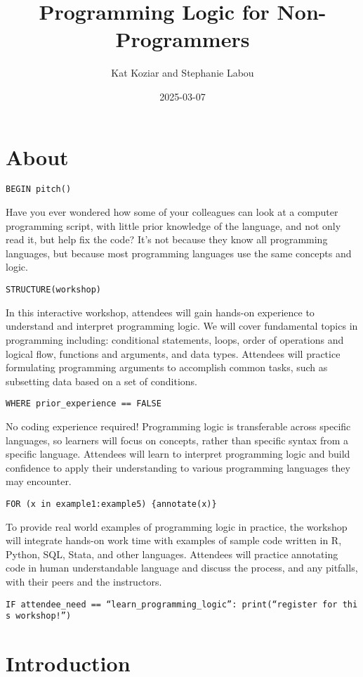 \documentclass[
]{book}
\title{Programming Logic for Non-Programmers}
\author{Kat Koziar and Stephanie Labou}
\date{2025-03-07}
\begin{document}
\maketitle

{
\setcounter{tocdepth}{1}
\tableofcontents
}
\chapter{About}\label{about}

\texttt{BEGIN\ pitch()}

Have you ever wondered how some of your colleagues can look at a computer programming script, with little prior knowledge of the language, and not only read it, but help fix the code? It's not because they know all programming languages, but because most programming languages use the same concepts and logic.

\texttt{STRUCTURE(workshop)}

In this interactive workshop, attendees will gain hands-on experience to understand and interpret programming logic. We will cover fundamental topics in programming including: conditional statements, loops, order of operations and logical flow, functions and arguments, and data types. Attendees will practice formulating programming arguments to accomplish common tasks, such as subsetting data based on a set of conditions.

\texttt{WHERE\ prior\_experience\ ==\ FALSE}

No coding experience required! Programming logic is transferable across specific languages, so learners will focus on concepts, rather than specific syntax from a specific language. Attendees will learn to interpret programming logic and build confidence to apply their understanding to various programming languages they may encounter.

\texttt{FOR\ (x\ in\ example1:example5)\ \{annotate(x)\}}

To provide real world examples of programming logic in practice, the workshop will integrate hands-on work time with examples of sample code written in R, Python, SQL, Stata, and other languages. Attendees will practice annotating code in human understandable language and discuss the process, and any pitfalls, with their peers and the instructors.

\texttt{IF\ attendee\_need\ ==\ “learn\_programming\_logic”:\ print(“register\ for\ this\ workshop!”)}

\chapter{Introduction}\label{intro}
\end{document}
